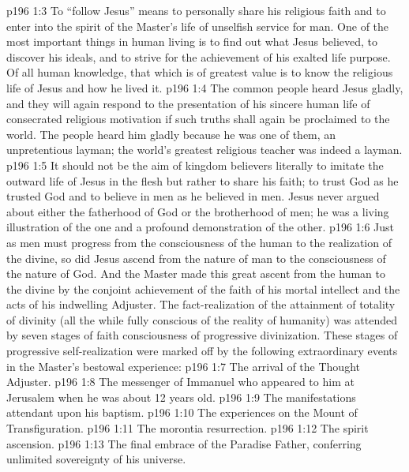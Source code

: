 \vs p196 1:3 \pc To “follow Jesus” means to personally share his religious faith and to enter into the spirit of the Master’s life of unselfish service for man. One of the most important things in human living is to find out what Jesus believed, to discover his ideals, and to strive for the achievement of his exalted life purpose. Of all human knowledge, that which is of greatest value is to know the religious life of Jesus and how he lived it.
\vs p196 1:4 The common people heard Jesus gladly, and they will again respond to the presentation of his sincere human life of consecrated religious motivation if such truths shall again be proclaimed to the world. The people heard him gladly because he was one of them, an unpretentious layman; the world’s greatest religious teacher was indeed a layman.
\vs p196 1:5 It should not be the aim of kingdom believers literally to imitate the outward life of Jesus in the flesh but rather to share his faith; to trust God as he trusted God and to believe in men as he believed in men. Jesus never argued about either the fatherhood of God or the brotherhood of men; he was a living illustration of the one and a profound demonstration of the other.
\vs p196 1:6 Just as men must progress from the consciousness of the human to the realization of the divine, so did Jesus ascend from the nature of man to the consciousness of the nature of God. And the Master made this great ascent from the human to the divine by the conjoint achievement of the faith of his mortal intellect and the acts of his indwelling Adjuster. The fact\hyp{}realization of the attainment of totality of divinity (all the while fully conscious of the reality of humanity) was attended by seven stages of faith consciousness of progressive divinization. These stages of progressive self\hyp{}realization were marked off by the following extraordinary events in the Master’s bestowal experience:
\vs p196 1:7 \bibnobreakspace The arrival of the Thought Adjuster.
\vs p196 1:8 \bibnobreakspace The messenger of Immanuel who appeared to him at Jerusalem when he was about 12 years old.
\vs p196 1:9 \bibnobreakspace The manifestations attendant upon his baptism.
\vs p196 1:10 \bibnobreakspace The experiences on the Mount of Transfiguration.
\vs p196 1:11 \bibnobreakspace The morontia resurrection.
\vs p196 1:12 \bibnobreakspace The spirit ascension.
\vs p196 1:13 \bibnobreakspace The final embrace of the Paradise Father, conferring unlimited sovereignty of his universe.
